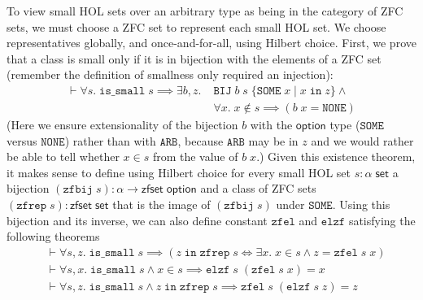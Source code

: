 \documentclass[twoside,titlepage,11pt]{article}
\begin{document}
To view small HOL sets over an arbitrary type as being in the category of ZFC sets, we must choose a ZFC set to represent each small HOL set.
We choose representatives globally, and once-and-for-all, using Hilbert choice.
First, we prove that a class is small only if it is in bijection with the elements of a ZFC set (remember the definition of smallness only required an injection):
\begin{align*}
\vdash\forall{s}.\;\mathtt{is\_small}\;s\implies\exists{b,z}.\;&\mathtt{BIJ}\;b\;s\;\{\mathtt{SOME}\;x\mid x\operatorname{\mathtt{in}}z\}\land{}\\
&\forall{x}.\;x\notin s\implies(b\;x=\mathtt{NONE})
\end{align*}
(Here we ensure extensionality of the bijection $b$ with the $\mathsf{option}$ type ($\mathtt{SOME}$ versus $\mathtt{NONE}$) rather than with $\mathtt{ARB}$, because $\mathtt{ARB}$ may be in $z$ and we would rather be able to tell whether $x\in s$ from the value of $b\;x$.)
Given this existence theorem, it makes sense to define using Hilbert choice for every small HOL set $s:\alpha\;\mathsf{set}$ a bijection $(\mathtt{zfbij}\;s):\alpha\to\mathsf{zfset}\;\mathsf{option}$ and a class of ZFC sets $(\mathtt{zfrep}\;s):\mathsf{zfset}\;\mathsf{set}$ that is the image of $(\mathtt{zfbij}\;s)$ under $\mathtt{SOME}$.
Using this bijection and its inverse, we can also define constant $\mathtt{zfel}$ and $\mathtt{elzf}$ satisfying the following theorems
\begin{align*}
&\vdash\forall{s,z}.\;\mathtt{is\_small}\;s\implies(z\operatorname{\mathtt{in}}\mathtt{zfrep}\;s\iff\exists{x}.\; x \in s \land z = \mathtt{zfel}\;s\;x)\\
&\vdash\forall{s,x}.\;\mathtt{is\_small}\;s\land x \in s\implies\mathtt{elzf}\;s\;(\mathtt{zfel}\;s\;x) = x\\
&\vdash\forall{s,z}.\;\mathtt{is\_small}\;s\land z \operatorname{\mathtt{in}} \mathtt{zfrep}\;s\implies\mathtt{zfel}\;s\;(\mathtt{elzf}\;s\;z) = z
\end{align*}
\end{document}
